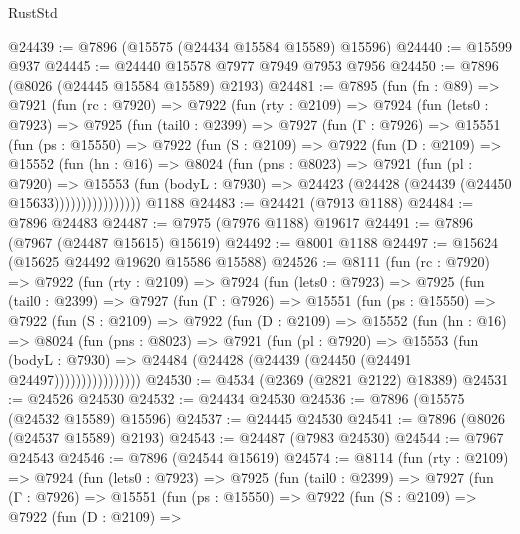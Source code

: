 \begin{lexlean}{RustStd}
\begin{coremodule}
@24439 := @7896 (@15575 (@24434 @15584 @15589) @15596)
@24440 := @15599 @937
@24445 := @24440 @15578 @7977 @7949 @7953 @7956
@24450 := @7896 (@8026 (@24445 @15584 @15589) @2193)
@24481 := @7895
    (fun (fn : @89) =>
    @7921
      (fun (rc : @7920) =>
      @7922
        (fun (rty : @2109) =>
        @7924
          (fun (lets0 : @7923) =>
          @7925
            (fun (tail0 : @2399) =>
            @7927
              (fun (Γ : @7926) =>
              @15551
                (fun (ps : @15550) =>
                @7922
                  (fun (S : @2109) =>
                  @7922
                    (fun (D : @2109) =>
                    @15552
                      (fun (hn : @16) =>
                      @8024
                        (fun (pns : @8023) =>
                        @7921
                          (fun (pl : @7920) =>
                          @15553
                            (fun (bodyL : @7930) =>
                            @24423 (@24428 (@24439 (@24450 @15633))))))))))))))))
    @1188
@24483 := @24421 (@7913 @1188)
@24484 := @7896 @24483
@24487 := @7975 (@7976 @1188) @19617
@24491 := @7896 (@7967 (@24487 @15615) @15619)
@24492 := @8001 @1188
@24497 := @15624 (@15625 @24492 @19620 @15586 @15588)
@24526 := @8111
    (fun (rc : @7920) =>
    @7922
      (fun (rty : @2109) =>
      @7924
        (fun (lets0 : @7923) =>
        @7925
          (fun (tail0 : @2399) =>
          @7927
            (fun (Γ : @7926) =>
            @15551
              (fun (ps : @15550) =>
              @7922
                (fun (S : @2109) =>
                @7922
                  (fun (D : @2109) =>
                  @15552
                    (fun (hn : @16) =>
                    @8024
                      (fun (pns : @8023) =>
                      @7921
                        (fun (pl : @7920) =>
                        @15553
                          (fun (bodyL : @7930) =>
                          @24484 (@24428 (@24439 (@24450 (@24491 @24497))))))))))))))))
@24530 := @4534 (@2369 (@2821 @2122) @18389)
@24531 := @24526 @24530
@24532 := @24434 @24530
@24536 := @7896 (@15575 (@24532 @15589) @15596)
@24537 := @24445 @24530
@24541 := @7896 (@8026 (@24537 @15589) @2193)
@24543 := @24487 (@7983 @24530)
@24544 := @7967 @24543
@24546 := @7896 (@24544 @15619)
@24574 := @8114
    (fun (rty : @2109) =>
    @7924
      (fun (lets0 : @7923) =>
      @7925
        (fun (tail0 : @2399) =>
        @7927
          (fun (Γ : @7926) =>
          @15551
            (fun (ps : @15550) =>
            @7922
              (fun (S : @2109) =>
              @7922
                (fun (D : @2109) =>

\end{coremodule}
\end{lexlean}
